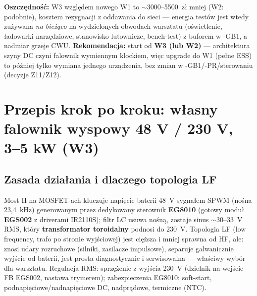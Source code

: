 \documentclass[11pt,a4paper]{article}
\begin{document}
\textbf{Oszczędność:} W3 względem nowego W1 to $\sim$3000--5500~zł mniej (W2: podobnie), kosztem
rezygnacji z oddawania do sieci --- energia testów jest wtedy zużywana \emph{na bieżąco} na
wydzielonych obwodach warsztatu (oświetlenie, ładowarki narzędziowe, stanowisko lutownicze,
bench-test) z buforem w -GB1, a nadmiar grzeje CWU. \textbf{Rekomendacja:} start od
\textbf{W3 (lub W2)} --- architektura szyny DC czyni falownik wymiennym klockiem, więc upgrade do
W1 (pełne ESS) to później tylko wymiana jednego urządzenia, bez zmian w -GB1/-PR/sterowaniu
(decyzje Z11/Z12).

\section{Przepis krok po kroku: własny falownik wyspowy 48 V / 230 V, 3--5 kW (W3)}
\label{sec:diy}
\subsection{Zasada działania i dlaczego topologia LF}
Most H na MOSFET-ach kluczuje napięcie baterii 48~V sygnałem SPWM (nośna 23,4~kHz) generowanym
przez dedykowany sterownik \textbf{EG8010} (gotowy moduł \textbf{EGS002} z driverami IR2110S);
filtr LC usuwa nośną, zostaje sinus $\sim$30--33~V RMS, który \textbf{transformator toroidalny}
podnosi do 230~V. Topologia LF (low frequency, trafo po stronie wyjściowej) jest cięższa i mniej
sprawna od HF, ale: znosi udary rozruchowe (silniki, zasilacze impulsowe), separuje galwanicznie
wyjście od baterii, jest prosta diagnostycznie i serwisowalna --- właściwy wybór dla warsztatu.
Regulacja RMS: sprzężenie z wyjścia 230~V (dzielnik na wejście FB EGS002, nastawa trymerem);
zabezpieczenia EG8010: soft-start, podnapięciowe/nadnapięciowe DC, nadprądowe, termiczne (NTC).
\end{document}
